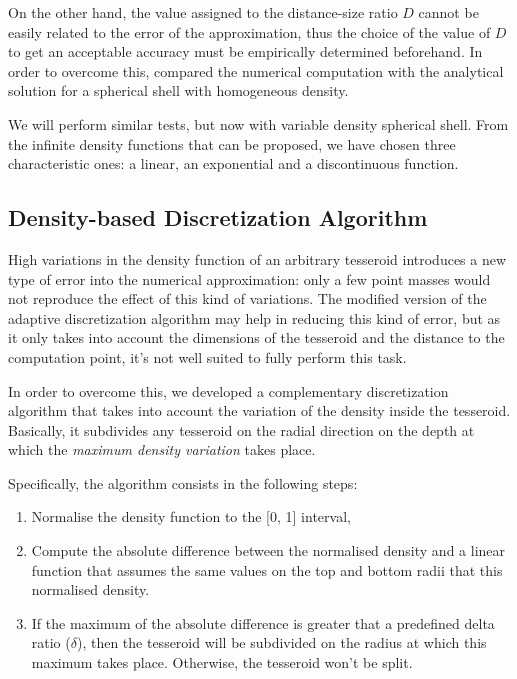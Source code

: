 \documentclass[extra]{gji}
\begin{document}
On the other hand, the value assigned to the distance-size ratio $D$ cannot be easily related to the error of the approximation, thus the choice of the value of $D$ to get an acceptable accuracy must be empirically determined beforehand.
In order to overcome this, \citet{Uieda2016} compared the numerical computation with the analytical solution for a spherical shell with homogeneous density.

We will perform similar tests, but now with variable density spherical shell.
From the infinite density functions that can be proposed, we have chosen three characteristic ones: a linear, an exponential and a discontinuous function.

\subsection{Density-based Discretization Algorithm}

High variations in the density function of an arbitrary tesseroid introduces a new type of error into the numerical approximation: only a few point masses would not reproduce the effect of this kind of variations.
The modified version of the adaptive discretization algorithm may help in reducing this kind of error, but as it only takes into account the dimensions of the tesseroid and the distance to the computation point, it's not well suited to fully perform this task.

In order to overcome this, we developed a complementary discretization algorithm that takes into account the variation of the density inside the tesseroid.
Basically, it subdivides any tesseroid on the radial direction on the depth at which the \emph{maximum density variation} takes place.

Specifically, the algorithm consists in the following steps:

\begin{enumerate}
\renewcommand{\theenumi}{(\arabic{enumi})}
    \item Normalise the density function to the [0, 1] interval,
    \item Compute the absolute difference between the normalised density and a linear function that assumes the same values on the top and bottom radii that this normalised density.
    \item If the maximum of the absolute difference is greater that a predefined delta ratio ($\delta$), then the tesseroid will be subdivided on the radius at which this maximum takes place. Otherwise, the tesseroid won't be split.
\end{enumerate}
\end{document}
